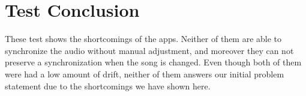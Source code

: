 \section{Test Conclusion}\label{sec:sota_test_conclusion}
These test shows the shortcomings of the apps.
Neither of them are able to synchronize the audio without manual adjustment, and moreover they can not preserve a synchronization when the song is changed.
Even though both of them were had a low amount of drift, neither of them answers our initial problem statement due to the shortcomings we have shown here.
